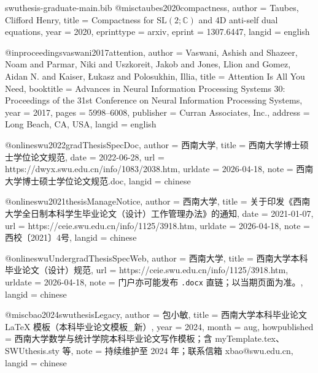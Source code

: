\begin{filecontents*}[overwrite]{swuthesis-graduate-main.bib}
@misc{taubes2020compactness,
  author     = {Taubes, Clifford Henry},
  title      = {{Compactness for $\mathrm{SL}(2;\mathbb{C})$ and 4D anti-self dual
    equations}},
  year       = {2020},
  eprinttype = {arxiv},
  eprint     = {1307.6447},
  langid     = {english}
}

@inproceedings{vaswani2017attention,
  author    = {Vaswani, Ashish and Shazeer, Noam and Parmar, Niki and Uszkoreit, Jakob
    and Jones, Llion and Gomez, Aidan N. and Kaiser, {\L}ukasz and Polosukhin, Illia},
  title     = {Attention Is All You Need},
  booktitle = {Advances in Neural Information Processing Systems 30:
    Proceedings of the 31st Conference on Neural Information Processing Systems},
  year      = {2017},
  pages     = {5998--6008},
  publisher = {Curran Associates, Inc.},
  address   = {Long Beach, CA, USA},
  langid    = {english}
}

@online{swu2022gradThesisSpecDoc,
  author    = {{西南大学}},
  title     = {西南大学博士硕士学位论文规范},
  date      = {2022-06-28},
  url       = {https://dwyx.swu.edu.cn/info/1083/2038.htm},
  urldate   = {2026-04-18},
  note      = {西南大学博士硕士学位论文规范.doc},
  langid    = {chinese}
}

@online{swu2021thesisManageNotice,
  author    = {{西南大学}},
  title     = {关于印发《西南大学全日制本科学生毕业论文（设计）工作管理办法》的通知},
  date      = {2021-01-07},
  url       = {https://ceie.swu.edu.cn/info/1125/3918.htm},
  urldate   = {2026-04-18},
  note      = {西校〔2021〕4号},
  langid    = {chinese}
}

@online{swuUndergradThesisSpecWeb,
  author    = {{西南大学}},
  title     = {西南大学本科毕业论文（设计）规范},
  url       = {https://ceie.swu.edu.cn/info/1125/3918.htm},
  urldate   = {2026-04-18},
  note      = {门户亦可能发布 \texttt{.docx} 直链；以当期页面为准。},
  langid    = {chinese}
}

@misc{bao2024swuthesisLegacy,
  author       = {包小敏},
  title        = {西南大学本科毕业论文 {\LaTeX} 模板（本科毕业论文模板\_新）},
  year         = {2024},
  month        = aug,
  howpublished = {西南大学数学与统计学院本科毕业论文写作模板；含 myTemplate.tex、SWUthesis.sty 等},
  note         = {持续维护至 2024 年；联系信箱 xbao@swu.edu.cn},
  langid       = {chinese}
}
\end{filecontents*}

\documentclass[master,punct=banjiao]{swuthesis}

\usepackage{subcaption}
\usepackage{longtable}
\usepackage{siunitx}
\usepackage{tikz}
\usetikzlibrary{arrows.meta,positioning}

